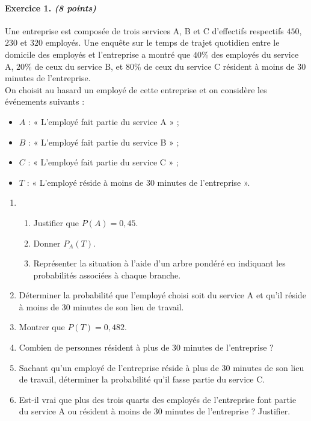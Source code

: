 \documentclass[11pt]{article}
\begin{document}
\paragraph{Exercice 1. \emph{(8 points)}} Une entreprise est composée de trois services A, B
et C d'effectifs respectifs $450$, $230$ et $320$ employés. Une enquête sur le
temps de trajet quotidien entre le domicile des employés et l'entreprise a
montré que $40$\% des employés du service A, $20$\% de ceux du service B, et
$80$\% de ceux du service C résident à moins de $30$ minutes de l'entreprise.\\
On choisit au hasard un employé de cette entreprise et on considère les
événements suivants :
\begin{itemize}
  \item $A$ : « L'employé fait partie du service A » ;
  \item $B$ : « L'employé fait partie du service B » ;
  \item $C$ : « L'employé fait partie du service C » ;
  \item $T$ : « L'employé réside à moins de $30$ minutes de l'entreprise ».
\end{itemize}
\begin{enumerate}
  \item \begin{enumerate}
      \item Justifier que $P(A)=0,45$.
      \item Donner $P_A(T)$.
      \item Représenter la situation à l'aide d'un arbre pondéré en indiquant
        les probabilités associées à chaque branche.
    \end{enumerate}
  \item Déterminer la probabilité que l'employé choisi soit du service A et
    qu'il réside à moins de $30$ minutes de son lieu de travail.
  \item Montrer que $P(T)=0,482$.
  \item Combien de personnes résident à plus de $30$ minutes de l'entreprise ?
  \item Sachant qu'un employé de l'entreprise réside à plus de $30$ minutes de
    son lieu de travail, déterminer la probabilité qu'il fasse partie du service
    C.
  \item Est-il vrai que plus des trois quarts des employés de l'entreprise font
    partie du service A ou résident à moins de $30$ minutes de l'entreprise ?
    Justifier.
\end{enumerate}
\end{document}
